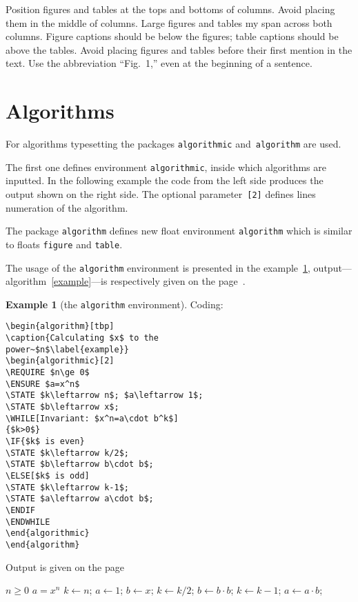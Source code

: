 \documentclass[conference]{IEEEtran}
\theoremstyle{definition}
\newtheorem{example}[remark]{Example}
\begin{document}
Position figures and tables at the tops and bottoms of columns.  Avoid placing them in the middle of columns.  Large figures and tables my span across both columns.  Figure captions should be below the figures; table captions should be above the tables.  Avoid placing figures and tables before their first mention in the text.  Use the abbreviation ``Fig.~1,'' even at the beginning of a sentence.


\section{Algorithms}

For algorithms typesetting the packages \verb|algorithmic| and~\verb|algorithm| are used. 

The first one defines environment \verb|algorithmic|, inside which algorithms are inputted. In the following example the code from the left side produces the output shown on the right side. The optional parameter~\verb|[2]| defines lines numeration of the algorithm.

The  package \verb|algorithm| defines new float environment \verb|algorithm| which is  similar to floats \verb|figure| and \verb|table|. 

The usage of the \verb|algorithm| environment is presented in the example~\ref{algorytm}, output---algorithm~\ref{example}---is respectively given on the page~\pageref{example}.


\begin{example}[the \texttt{algorithm} environment]\label{algorytm}
Coding:\begin{verbatim}\begin{algorithm}[tbp]
\caption{Calculating $x$ to the 
power~$n$\label{example}}
\begin{algorithmic}[2]
\REQUIRE $n\ge 0$
\ENSURE $a=x^n$
\STATE $k\leftarrow n$; $a\leftarrow 1$; 
\STATE $b\leftarrow x$;
\WHILE[Invariant: $x^n=a\cdot b^k$]
{$k>0$}
\IF{$k$ is even}
\STATE $k\leftarrow k/2$;
\STATE $b\leftarrow b\cdot b$;
\ELSE[$k$ is odd]
\STATE $k\leftarrow k-1$;
\STATE $a\leftarrow a\cdot b$;
\ENDIF
\ENDWHILE
\end{algorithmic}
\end{algorithm}
\end{verbatim}
\end{example}

Output is given on the page~\pageref{example}
\begin{algorithm}[tbp]
\caption{Calculating $x$ to the 
power~$n$\label{example}}
\begin{algorithmic}[2]
\REQUIRE $n\ge 0$
\ENSURE $a=x^n$
\STATE $k\leftarrow n$; $a\leftarrow 1$; 
\STATE $b\leftarrow x$;
\STATE $k\leftarrow k/2$;
\STATE $b\leftarrow b\cdot b$;
\ELSE[$k$ is odd]
\STATE $k\leftarrow k-1$;
\STATE $a\leftarrow a\cdot b$;
\ENDIF
\ENDWHILE
\end{algorithmic}
\end{algorithm}
\end{document}
